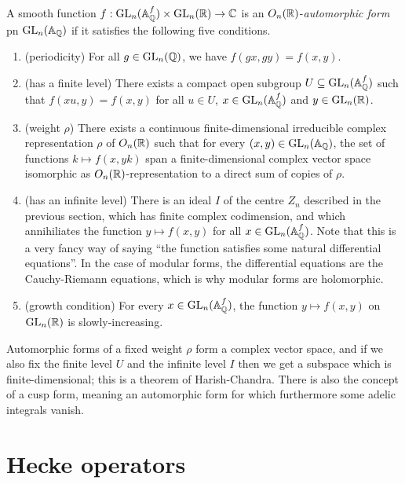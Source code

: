 \begin{definition}
  \label{AutomorphicForm.GLn.AutomorphicFormForGLnOverQ}
  A smooth function $f:\operatorname{GL}_n(\mathbb{A}_{\mathbb{Q}}^f)\times\operatorname{GL}_n(\mathbb{R})\to\mathbb{C}$ is
  an $O_n(\mathbb{R})$-\emph{automorphic form} pn $\operatorname{GL}_n(\mathbb{A}_{\mathbb{Q}})$ if it satisfies the following
  five conditions.
  \begin{enumerate}
    \item (periodicity) For all $g\in\operatorname{GL}_n(\mathbb{Q})$, we have $f(gx,gy)=f(x,y)$.
    \item (has a finite level) There exists a compact open subgroup $U\subseteq\operatorname{GL}_n(\mathbb{A}_{\mathbb{Q}}^f)$
      such that $f(xu,y)=f(x,y)$ for all $u\in U$, $x\in \operatorname{GL}_n(\mathbb{A}_{\mathbb{Q}}^f)$ and $y\in\operatorname{GL}_n(\mathbb{R})$.
    \item (weight $\rho$) There exists a continuous finite-dimensional irreducible complex
    representation $\rho$ of $O_n(\mathbb{R})$ such that for every $(x,y)\in\operatorname{GL}_n(\mathbb{A}_{\mathbb{Q}})$, the
    set of functions $k\mapsto f(x,yk)$ span a finite-dimensional complex vector space isomorphic
    as $O_n(\mathbb{R})$-representation to a direct sum of copies of $\rho$.
    \item (has an infinite level) There is an ideal $I$ of the centre $Z_n$ described in the
    previous section, which has finite complex codimension, and which annihiliates the
    function $y \mapsto f(x,y)$ for all $x\in \operatorname{GL}_n(\mathbb{A}_{\mathbb{Q}}^f)$. Note that this is a very fancy
    way of saying ``the function satisfies some natural differential equations''. In the
    case of modular forms, the differential equations are the Cauchy-Riemann equations, which
    is why modular forms are holomorphic.
    \item (growth condition) For every $x\in\operatorname{GL}_n(\mathbb{A}_{\mathbb{Q}}^f)$, the function $y\mapsto f(x,y)$
  on $\operatorname{GL}_n(\mathbb{R})$ is slowly-increasing.
  \end{enumerate}

\end{definition}

Automorphic forms of a fixed weight $\rho$ form a complex vector space, and if we also
fix the finite level $U$ and the infinite level $I$ then we get a subspace which is
finite-dimensional; this is a theorem of Harish-Chandra. There is also the concept
of a cusp form, meaning an automorphic form for which furthermore some adelic integrals
vanish.

\section{Hecke operators}

